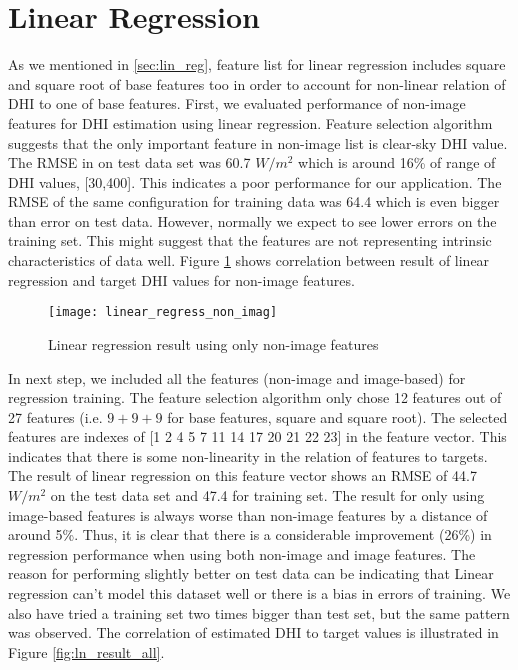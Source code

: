 \section{Linear Regression}
As we mentioned in \ref{sec:lin_reg}, feature list for linear regression includes square and square root of base features too in order to account for non-linear relation of DHI to one of base features. 
First, we evaluated performance of non-image features for DHI estimation using linear regression. Feature selection algorithm suggests that the only important feature in non-image list is clear-sky DHI value. The RMSE in on test data set was 60.7 $W/m^2$ which is around 16\% of range of DHI values, [30,400]. This indicates a poor performance for our application. The RMSE of the same configuration for training data was 64.4 which is even bigger than error on test data. However, normally we expect to see lower errors on the training set. This might suggest that the features are not representing intrinsic characteristics of data well. Figure \ref{fig:ln_result_no_image} shows correlation between result of linear regression and target DHI values for non-image features.

\begin{figure}[h]
\caption{Linear regression result using only non-image features}
\label{fig:ln_result_no_image}
\texttt{[image: linear\_regress\_non\_imag]}
\centering
\end{figure}

In next step, we included all the features (non-image and image-based) for regression training. The feature selection algorithm only chose 12 features out of 27 features (i.e. $9+9+9$ for base features, square and square root). The selected features are indexes of [1 2 4 5 7 11 14 17 20 21 22 23] in the feature vector. This indicates that there is some non-linearity in the relation of features to targets. The result of linear regression on this feature vector shows an RMSE of 44.7  $W/m^2$ on the test data set and 47.4 for training set. The result for only using image-based features is always worse than non-image features by a distance of around 5\%. Thus, it is clear that there is a considerable improvement (26\%) in regression performance when using both non-image and image features. The reason for performing slightly better on test data can be indicating that Linear regression can't model this dataset well or there is a bias in errors of training. We also have tried a training set two times bigger than test set, but the same pattern was observed. The correlation of estimated DHI to target values is illustrated in Figure \ref{fig:ln_result_all}. 

